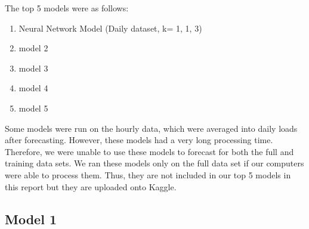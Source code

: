\documentclass[
]{article}
\providecommand{\tightlist}{%
  \setlength{\itemsep}{0pt}\setlength{\parskip}{0pt}}
\begin{document}
The top 5 models were as follows:

\begin{enumerate}
\def\labelenumi{\arabic{enumi}.}
\tightlist
\item
  Neural Network Model (Daily dataset, k= 1, 1, 3)
\item
  model 2
\item
  model 3
\item
  model 4
\item
  model 5
\end{enumerate}

Some models were run on the hourly data, which were averaged into daily
loads after forecasting. However, these models had a very long
processing time. Therefore, we were unable to use these models to
forecast for both the full and training data sets. We ran these models
only on the full data set if our computers were able to process them.
Thus, they are not included in our top 5 models in this report but they
are uploaded onto Kaggle.

\subsection{Model 1}\label{model-1}
\end{document}

